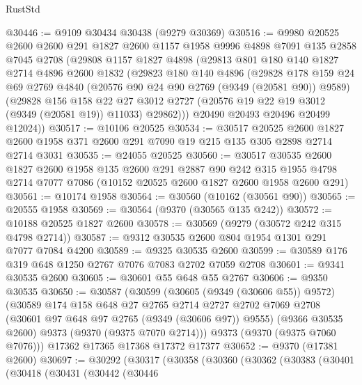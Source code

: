 \begin{lexlean}{RustStd}
\begin{coremodule}
{\begin{coremodule}
{{{{{{{{{{{{{{{{{{{{{{{{{{{{{{{{{{{{{{{@30446 := @9109 @30434 @30438 (@9279 @30369)
@30516 := @9980
    @20525
    @2600
    @2600
    @291
    @1827
    @2600
    @1157
    @1958
    @9996
    @4898
    @7091
    @135
    @2858
    @7045
    @2708
    (@29808
      @1157
      @1827
      @4898
      (@29813
        @801
        @180
        @140
        @1827
        @2714
        @4896
        @2600
        @1832
        (@29823
          @180
          @140
          @4896
          (@29828
            @178
            @159
            @24
            @69
            @2769
            @4840
            (@20576 @90 @24 @90 @2769 (@9349 (@20581 @90)) @9589)
            (@29828
              @156
              @158
              @22
              @27
              @3012
              @2727
              (@20576 @19 @22 @19 @3012 (@9349 (@20581 @19)) @11033)
              @29862)))
        @20490
        @20493
        @20496
        @20499
        @12024))
@30517 := @10106 @20525
@30534 := @30517
    @20525
    @2600
    @1827
    @2600
    @1958
    @371
    @2600
    @291
    @7090
    @19
    @215
    @135
    @305
    @2898
    @2714
    @2714
    @3031
@30535 := @24055 @20525
@30560 := @30517
    @30535
    @2600
    @1827
    @2600
    @1958
    @135
    @2600
    @291
    @2887
    @90
    @242
    @315
    @1955
    @4798
    @2714
    @7077
    @7086
    (@10152 @20525 @2600 @1827 @2600 @1958 @2600 @291)
@30561 := @10174 @1958
@30564 := @30560 (@10162 (@30561 @90))
@30565 := @20555 @1958
@30569 := @30564 (@9370 (@30565 @135 @242))
@30572 := @10188 @20525 @1827 @2600
@30578 := @30569 (@9279 (@30572 @242 @315 @4798 @2714))
@30587 := @9312 @30535 @2600 @804 @1954 @1301 @291 @7077 @7084 @4200
@30589 := @9325 @30535 @2600
@30599 := @30589 @176 @319 @648 @1250 @2767 @7076 @7083 @2702 @7059 @2708
@30601 := @9341 @30535 @2600
@30605 := @30601 @55 @648 @55 @2767
@30606 := @9350 @30535
@30650 := @30587
    (@30599
      (@30605 (@9349 (@30606 @55)) @9572)
      (@30589
        @174
        @158
        @648
        @27
        @2765
        @2714
        @2727
        @2702
        @7069
        @2708
        (@30601 @97 @648 @97 @2765 (@9349 (@30606 @97)) @9555)
        (@9366 @30535 @2600)
        @9373
        (@9370 (@9375 @7070 @2714)))
      @9373
      (@9370 (@9375 @7060 @7076)))
    @17362
    @17365
    @17368
    @17372
    @17377
@30652 := @9370 (@17381 @2600)
@30697 := @30292
    (@30317
      (@30358
        (@30360
          (@30362
            (@30383
              (@30401
                (@30418
                  (@30431
                    (@30442
                      (@30446
}}}}}}}}}}}}}}}}}}}}}}}}}}}}}}}}}}}}}}}
\end{coremodule}}
\end{coremodule}
\end{lexlean}
